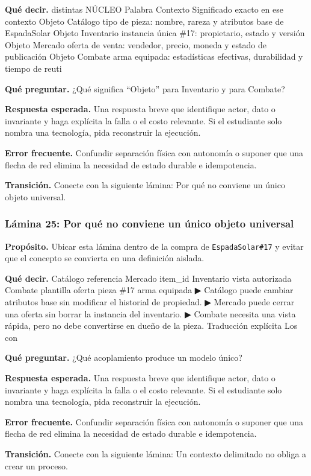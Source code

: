 \documentclass[variant=docente,cover=institutional,mode=screen]{ua-engineering-v6-article}
\begin{document}
\textbf{Qué decir.} distintas NÚCLEO Palabra Contexto Significado exacto en ese contexto Objeto Catálogo tipo de pieza: nombre, rareza y atributos base de EspadaSolar Objeto Inventario instancia única \#17: propietario, estado y versión Objeto Mercado oferta de venta: vendedor, precio, moneda y estado de publicación Objeto Combate arma equipada: estadísticas efectivas, durabilidad y tiempo de reuti

\textbf{Qué preguntar.} ¿Qué significa “Objeto” para Inventario y para Combate?

\textbf{Respuesta esperada.} Una respuesta breve que identifique actor, dato o invariante y haga explícita la falla o el costo relevante. Si el estudiante solo nombra una tecnología, pida reconstruir la ejecución.

\textbf{Error frecuente.} Confundir separación física con autonomía o suponer que una flecha de red elimina la necesidad de estado durable e idempotencia.

\textbf{Transición.} Conecte con la siguiente lámina: Por qué no conviene un único objeto universal.

\subsubsection*{Lámina 25: Por qué no conviene un único objeto universal}
\textbf{Propósito.} Ubicar esta lámina dentro de la compra de \texttt{EspadaSolar\#17} y evitar que el concepto se convierta en una definición aislada.

\textbf{Qué decir.} Catálogo referencia Mercado item\_id Inventario vista autorizada Combate plantilla oferta pieza \#17 arma equipada ▶ Catálogo puede cambiar atributos base sin modificar el historial de propiedad. ▶ Mercado puede cerrar una oferta sin borrar la instancia del inventario. ▶ Combate necesita una vista rápida, pero no debe convertirse en dueño de la pieza. Traducción explícita Los con

\textbf{Qué preguntar.} ¿Qué acoplamiento produce un modelo único?

\textbf{Respuesta esperada.} Una respuesta breve que identifique actor, dato o invariante y haga explícita la falla o el costo relevante. Si el estudiante solo nombra una tecnología, pida reconstruir la ejecución.

\textbf{Error frecuente.} Confundir separación física con autonomía o suponer que una flecha de red elimina la necesidad de estado durable e idempotencia.

\textbf{Transición.} Conecte con la siguiente lámina: Un contexto delimitado no obliga a crear un proceso.
\end{document}
